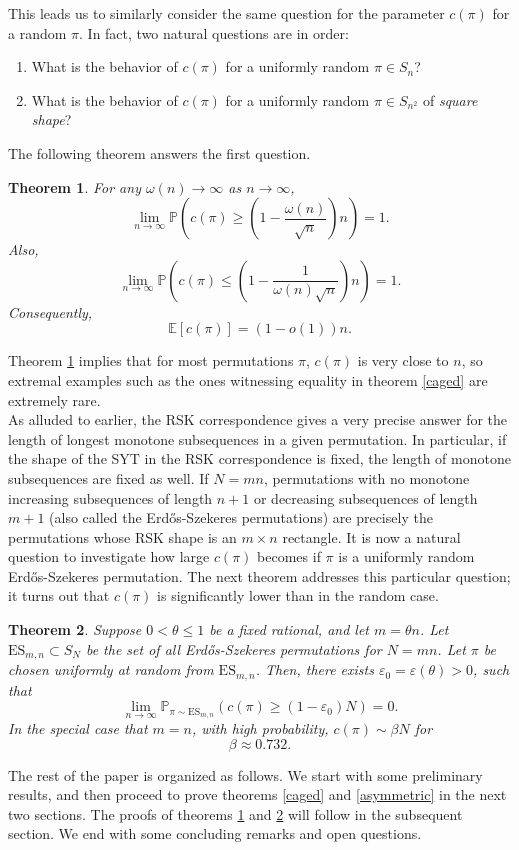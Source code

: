 \documentclass[11pt, a4paper]{article}
\theoremstyle{compact}
\newtheorem{theorem}{Theorem}[section]
\begin{document}
This leads us to similarly consider the same question for the parameter $c(\pi)$ for a random $\pi$. In fact, two natural questions are in order: 
\begin{enumerate}
    \item What is the behavior of $c(\pi)$ for a uniformly random $\pi\in S_n$?
    \item What is the behavior of $c(\pi)$ for a uniformly random $\pi\in S_{n^2}$ of \emph{square shape}? 
\end{enumerate}
The following theorem answers the first question.  
\begin{theorem}\label{expectation}
For any $\omega(n) \rightarrow \infty$ as $n \rightarrow \infty$,
\[
  \lim_{n \rightarrow \infty} \mathbb{P}\left( c(\pi) \geq \left(1-\frac{\omega(n)}{\sqrt{n}}\right)n \right) = 1.
\]
Also, 
\[
  \lim_{n \rightarrow \infty} \mathbb{P}\left( c(\pi) \leq \left(1-\frac{1}{\omega(n)\sqrt{n}}\right)n \right) = 1.
\]
Consequently, 
\[
\mathbb{E}[c(\pi)] = (1 - o(1))n .
\]
\end{theorem}
Theorem \ref{expectation} implies that for most permutations $\pi$, $c(\pi)$ is very close to $n$, so extremal examples such as the ones witnessing equality in theorem \ref{caged} are extremely rare. \\

As alluded to earlier, the RSK correspondence gives a very precise answer for the length of longest monotone subsequences in a given permutation. In particular, if the shape of the SYT in the RSK correspondence is fixed, the length of monotone subsequences are fixed as well. If $N=mn$, permutations with no monotone  increasing subsequences of length $n+1$ or decreasing subsequences of length $m+1$ (also called the Erd\H{o}s-Szekeres permutations) are precisely the permutations whose RSK shape is an $m\times n$ rectangle.   It is now a natural question to investigate how large $c(\pi)$ becomes if $\pi$ is a uniformly random Erd\H{o}s-Szekeres permutation. The next theorem addresses this particular question; it turns out that $c(\pi)$ is significantly lower than in the random case. 

\begin{theorem}\label{sqaure} Suppose $0<\theta\le 1$ be a fixed rational, and let $m=\theta n$.
    Let $\mathrm{ES}_{m,n} \subset S_{N} $ be the set of all Erd\H{o}s-Szekeres permutations for $N = mn$. Let $\pi$ be chosen uniformly at random from $\mathrm{ES}_{m,n}$. Then, there exists $ \varepsilon_0=\varepsilon(\theta) > 0$, such that  
    \[
    \lim_{n \rightarrow \infty} \mathbb{P}_{\pi \sim \mathrm{ES}_{m,n}}\left( c(\pi) \geq (1-\varepsilon_0)N \right) = 0.
    \]
    In the special case that $m=n$, with high probability, $c(\pi) \sim \beta N$ for 
    \[
    \beta \approx 0.732.
    \]
\end{theorem}
The rest of the paper is organized as follows. We start with some preliminary results, and then proceed to prove theorems \ref{caged} and \ref{asymmetric} in the next two sections. The proofs of theorems \ref{expectation} and \ref{sqaure} will follow in the subsequent section. We end with some concluding remarks and open questions.\\
\end{document}
